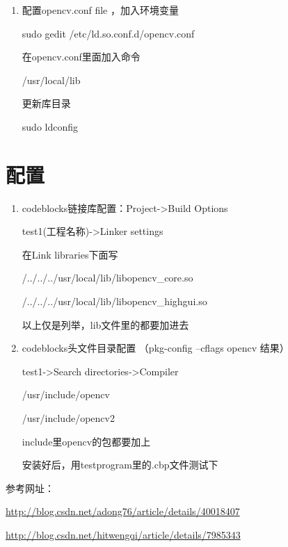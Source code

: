 \documentclass[12pt]{article}
\begin{document}
\begin{enumerate}
\item 配置opencv.conf file ，加入环境变量  

sudo gedit /etc/ld.so.conf.d/opencv.conf

在opencv.conf里面加入命令

/usr/local/lib

更新库目录

sudo ldconfig

\begin{comment}

打开文件bash.bashrc  //这个暂时不知道是干嘛的,我没执行, 程序没影响

sudo gedit /etc/bash.bashrc

加入下面两行

PKG\_CONFIG\_PATH=\$PKG\_CONFIG\_PATH:/usr/local/lib/pkgconfig

export PKG\_CONFIG\_PATH\

\end{comment}

\end{enumerate}

\section{配置}

\begin{enumerate}
\item codeblocks链接库配置：Project->Build Options

test1(工程名称)->Linker settings

在Link libraries下面写

/../../../usr/local/lib/libopencv\_core.so

/../../../usr/local/lib/libopencv\_highgui.so

以上仅是列举，lib文件里的都要加进去

\item codeblocks头文件目录配置 （pkg-config --cflags opencv 结果）

test1->Search directories->Compiler

/usr/include/opencv

/usr/include/opencv2

include里opencv的包都要加上

\begin{comment}

\item CodeBlocks 路文件目录配置

test1->Search directories->Linker

/usr/lib

\end{comment}

安装好后，用testprogram里的.cbp文件测试下

\end{enumerate}

参考网址：

\url{http://blog.csdn.net/adong76/article/details/40018407}
          
\url{http://blog.csdn.net/hitwengqi/article/details/7985343}
\end{document}
